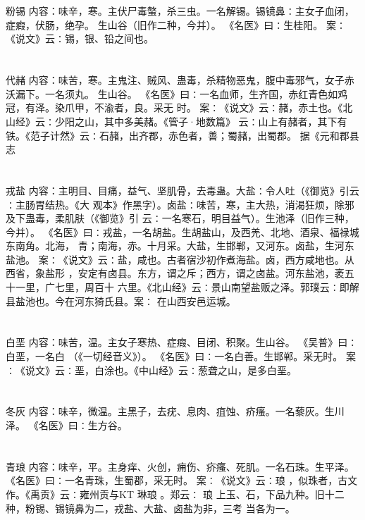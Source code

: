 \documentclass[12pt,UTF8]{ctexbook}
\begin{document}
\chapter{}粉锡
内容：味辛，寒。主伏尸毒螫，杀三虫。一名解锡。锡镜鼻∶主女子血闭，症瘕，伏肠，绝孕。 
生山谷（旧作二种，今并）。 
《名医》曰∶生桂阳。 
案∶《说文》云∶锡，银、铅之间也。 


\chapter{}代赭
内容：味苦，寒。主鬼注、贼风、蛊毒，杀精物恶鬼，腹中毒邪气，女子赤沃漏下。一名须丸。 
生山谷。 
《名医》曰∶一名血师，生齐国，赤红青色如鸡冠，有泽。染爪甲，不渝者，良。采无 
时。 
案∶《说文》云∶赭，赤土也。《北山经》云∶少阳之山，其中多美赭。《管子·地数篇》 
云∶山上有赭者，其下有铁。《范子计然》云∶石赭，出齐郡，赤色者，善；蜀赭，出蜀郡。 
据《元和郡县志 


\chapter{}戎盐
内容：主明目、目痛，益气、坚肌骨，去毒蛊。大盐∶令人吐（《御览》引云∶主肠胃结热。《大 
观本》作黑字）。卤盐∶味苦，寒，主大热，消渴狂烦，除邪及下蛊毒，柔肌肤（《御览》引 
云∶一名寒石，明目益气）。生池泽（旧作三种，今并）。 
《名医》曰∶戎盐，一名胡盐。生胡盐山，及西羌、北地、酒泉、福禄城东南角。北海， 
青；南海，赤。十月采。大盐，生邯郸，又河东。卤盐，生河东盐池。 
案∶《说文》云∶盐，咸也。古者宿沙初作煮海盐。卤，西方咸地也。从西省，象盐形 
，安定有卤县。东方，谓之斥；西方，谓之卤盐。河东盐池，袤五十一里，广七里，周百十 
六里。《北山经》云∶景山南望盐贩之泽。郭璞云∶即解县盐池也。今在河东猗氏县。案∶ 
在山西安邑运城。 


\chapter{}白垩
内容：味苦，温。主女子寒热、症瘕、目闭、积聚。生山谷。 
《吴普》曰∶白垩，一名白 （《一切经音义》）。 
《名医》曰∶一名白善。生邯郸。采无时。 
案∶《说文》云∶垩，白涂也。《中山经》云∶葱聋之山，是多白垩。 


\chapter{}冬灰
内容：味辛，微温。主黑子，去疣、息肉、疽蚀、疥瘙。一名藜灰。生川泽。 
《名医》曰∶生方谷。 


\chapter{}青琅
内容：味辛，平。主身痒、火创，痈伤、疥瘙、死肌。一名石珠。生平泽。 
《名医》曰∶一名青珠，生蜀郡，采无时。 
案∶《说文》云∶琅 ，似珠者，古文作。《禹贡》云∶雍州贡与KT 琳琅 。郑云∶ 
琅 
上玉、石，下品九种。旧十二种，粉锡、锡镜鼻为二，戎盐、大盐、卤盐为非，三考 
当各为一。 
\end{document}
